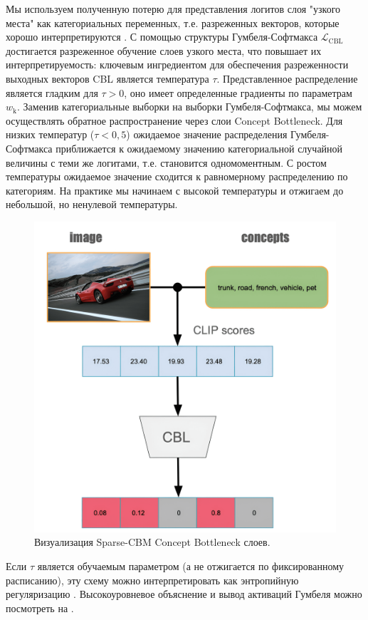 Мы используем полученную потерю для представления логитов слоя "узкого места" как категориальных переменных, т.е. разреженных векторов, которые хорошо интерпретируются \cite{pmlr-v139-wong21b}. С помощью структуры Гумбеля-Софтмакса $\mathcal{L}_{\mathrm{CBL}}$ достигается разреженное обучение слоев узкого места, что повышает их интерпретируемость: ключевым ингредиентом для обеспечения разреженности выходных векторов CBL является температура $\tau$. Представленное распределение является гладким для $\tau > 0$, оно имеет определенные градиенты по параметрам $w_{\mathrm{k}}$. Заменив категориальные выборки на выборки Гумбеля-Софтмакса, мы можем осуществлять обратное распространение через слои Concept Bottleneck. Для низких температур ($\tau < 0,5$) ожидаемое значение распределения Гумбеля-Софтмакса приближается к ожидаемому значению категориальной случайной величины с теми же логитами, т.е. становится одномоментным. С ростом температуры ожидаемое значение сходится к равномерному распределению по категориям. На практике мы начинаем с высокой температуры и отжигаем до небольшой, но ненулевой температуры.

\begin{figure}[h]
\begin{center}
\centerline{
\includegraphics[width=0.6\columnwidth]{./figures/gumbel_example-compressed.png}}
\caption{Визуализация Sparse-CBM Concept Bottleneck слоев.}
\label{fig:gumbel_example}
\end{center}
\end{figure}
Если $\tau$ является обучаемым параметром (а не отжигается по фиксированному расписанию), эту схему можно интерпретировать как энтропийную регуляризацию \cite{szegedy2015rethinking,pereyra2017regularizing}. Высокоуровневое объяснение и вывод активаций Гумбеля можно посмотреть на \cite{alexandridis2022longtailed}.

